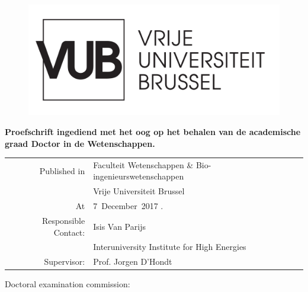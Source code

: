
\begin{center}
	\vspace*{5mm}
     
    \begin{figure}[ht]
    	\centering
    	\includegraphics[width=0.5\linewidth]{"VUB MONO positief/VUB MONO POSITIEF OUTLINE"}
    	\label{fig:vub-mono-positief-outline}
    \end{figure}
    
	\huge \textbf{\Title}

	\vspace{10mm}

	\Large \Author
	
	\vspace{15mm}
	\large \textbf{Proefschrift ingediend met het oog op het behalen van de academische graad Doctor in de Wetenschappen.}

	\vspace{25mm}
	\small
	\begin{tabular}{rl}
     Published in & Faculteit Wetenschappen \& Bio-ingenieurswetenschappen \\[2mm]
                  &\large Vrije Universiteit Brussel \\[2mm]
               At & \large 7~December~2017 .\\[15mm]
   Responsible Contact: & \large Isis Van Parijs \\[1mm]
                  & Interuniversity Institute for High Energies\\
                  Supervisor: & Prof. Jorgen D'Hondt
	\end{tabular}


\end{center}

\thispagestyle{empty}
\newpage
\null

Doctoral examination commission:\\

